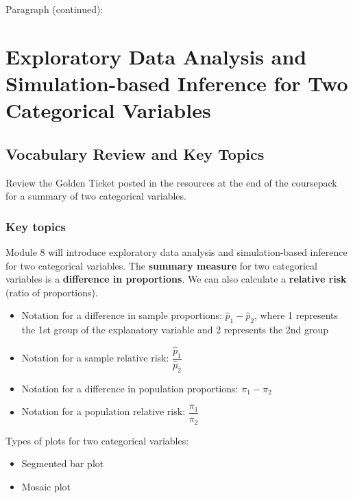 \documentclass[
]{report}
\begin{document}
\newpage

Paragraph (continued):

\newpage

\chapter{Exploratory Data Analysis and Simulation-based Inference for Two Categorical Variables}\label{exploratory-data-analysis-and-simulation-based-inference-for-two-categorical-variables}

\section{Vocabulary Review and Key Topics}\label{vocabulary-review-and-key-topics-6}

Review the Golden Ticket posted in the resources at the end of the coursepack for a summary of two categorical variables.

\subsection{Key topics}\label{key-topics-7}

Module 8 will introduce exploratory data analysis and simulation-based inference for two categorical variables. The \textbf{summary measure} for two categorical variables is a \textbf{difference in proportions}. We can also calculate a \textbf{relative risk} (ratio of proportions).

\begin{itemize}
\item
  Notation for a difference in sample proportions: \(\hat{p}_1 - \hat{p}_2\), where 1 represents the 1st group of the explanatory variable and 2 represents the 2nd group
\item
  Notation for a sample relative risk: \(\dfrac{\hat{p}_1}{\hat{p}_2}\)
\item
  Notation for a difference in population proportions: \(\pi_1 - \pi_2\)
\item
  Notation for a population relative risk: \(\dfrac{\pi_1}{\pi_2}\)
\end{itemize}

Types of plots for two categorical variables:

\begin{itemize}
\item
  Segmented bar plot
\item
  Mosaic plot
\end{itemize}
\end{document}
